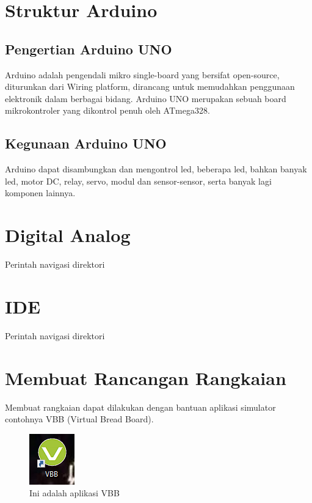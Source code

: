 \section{Struktur Arduino}
\subsection{Pengertian Arduino UNO}
Arduino adalah pengendali mikro single-board yang bersifat open-source, diturunkan dari Wiring platform, dirancang untuk memudahkan penggunaan elektronik dalam berbagai bidang. Arduino UNO merupakan sebuah board mikrokontroler yang dikontrol penuh oleh ATmega328.

\subsection{Kegunaan Arduino UNO}
Arduino dapat disambungkan dan mengontrol led, beberapa led, bahkan banyak led, motor DC, relay, servo, modul dan sensor-sensor, serta banyak lagi komponen lainnya.

\section{Digital Analog}
Perintah navigasi direktori

\section{IDE}
Perintah navigasi direktori

\section{Membuat Rancangan Rangkaian}
    Membuat rangkaian dapat dilakukan dengan bantuan aplikasi simulator contohnya VBB (Virtual Bread Board).
\begin{figure}[!htbp]
  \centering
  \includegraphics[width=.45\textwidth]{figures/VBB/vbb.png}
  \caption{Ini adalah aplikasi VBB}\label{fig:vbb}
\end{figure}

